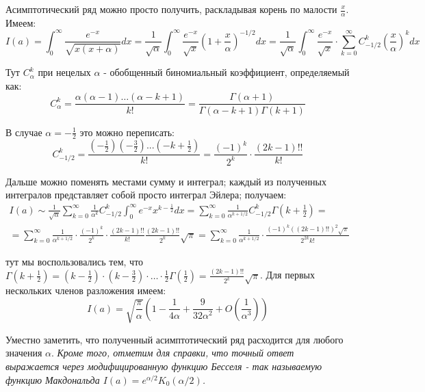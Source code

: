 \documentclass[a4paper,12pt]{article}
\begin{document}
Асимптотический ряд можно просто получить, раскладывая корень по малости
$\frac{x}{\alpha}$. Имеем:
\[
I\left(a\right)=\int_{0}^{\infty}\frac{e^{-x}}{\sqrt{x(x+\alpha)}}dx=\frac{1}{\sqrt{\alpha}}\int_{0}^{\infty}\frac{e^{-x}}{\sqrt{x}}\left(1+\frac{x}{\alpha}\right)^{-1/2}dx=\frac{1}{\sqrt{\alpha}}\int_{0}^{\infty}\frac{e^{-x}}{\sqrt{x}}\cdot\sum_{k=0}^{\infty}C_{-1/2}^{k}\left(\frac{x}{\alpha}\right)^{k}dx
\]

\noindent
Тут $C_{\alpha}^{k}$ при нецелых $\alpha$ - обобщенный биномиальный
коэффициент, определяемый как:
\[
C_{\alpha}^{k}=\frac{\alpha(\alpha-1)\dots(\alpha-k+1)}{k!}=\frac{\Gamma(\alpha+1)}{\Gamma(\alpha-k+1)\Gamma(k+1)}
\]

\noindent
В случае $\alpha=-\frac{1}{2}$ это можно переписать:
\[
C_{-1/2}^{k}
=
\frac{   \left(-\frac{1}{2}\right)  \left(-\frac{3}{2}\right)...\left(-k+\frac{1}{2}\right)}{k!} = \frac{(-1)^{k}}{2^{k}}\cdot\frac{(2k-1)!!}{k!}
\]

\noindent
Дальше можно поменять местами сумму и интеграл; каждый из полученных
интегралов представляет собой просто интеграл Эйлера; получаем:
\begin{multline*}
I(a)\sim\frac{1}{\sqrt{\alpha}}\sum_{k=0}^{\infty}\frac{1}{\alpha^{k}}C_{-1/2}^{k}\int_{0}^{\infty}e^{-x}x^{k-\frac{1}{2}}dx=\sum_{k=0}^{\infty}\frac{1}{\alpha^{k+1/2}}C_{-1/2}^{k}\Gamma\left(k+\frac{1}{2}\right)=\\
=\sum_{k=0}^{\infty}\frac{1}{\alpha^{k+1/2}}\cdot\frac{(-1)^{k}}{2^{k}}\cdot\frac{\left(2k-1\right)!!}{k!}\frac{\left(2k-1\right)!!}{2^{k}}\sqrt{\pi}=\sum_{k=0}^{\infty}\frac{1}{\alpha^{k+1/2}}\cdot\frac{(-1)^{k}((2k-1)!!)^{2}\sqrt{\pi}}{2^{2k}k!}
\end{multline*}

\noindent
тут мы воспользовались тем, что $\Gamma\left(k+\frac{1}{2}\right)=\left(k-\frac{1}{2}\right)\cdot\left(k-\frac{3}{2}\right)\cdot\dots\cdot\frac{1}{2}\Gamma\left(\frac{1}{2}\right)=\frac{(2k-1)!!}{2^{k}}\sqrt{\pi}$.
Для первых нескольких членов разложения имеем:
\[
I(a)=\sqrt{\frac{\pi}{\alpha}}\left(1-\frac{1}{4\alpha}+\frac{9}{32\alpha^{2}}+O\left(\frac{1}{\alpha^{3}}\right)\right)
\]

\noindent
Уместно заметить, что полученный асимптотический ряд расходится для любого значения $\alpha$.
\textit{Кроме того, отметим для справки, что точный ответ
выражается через модифицированную функцию Бесселя - так называемую
функцию Макдональда $I(a)=e^{\alpha/2}K_{0}(\alpha/2)$.}
\end{document}
